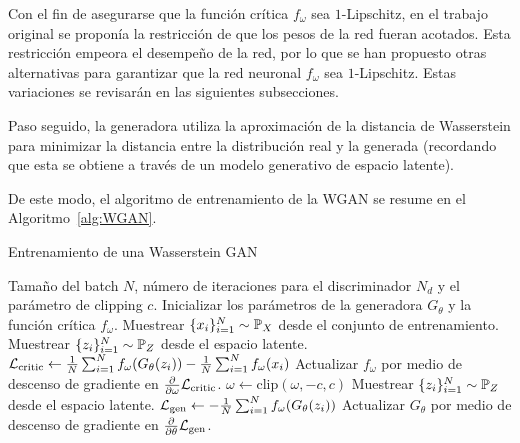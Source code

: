 Con el fin de asegurarse que la función crítica $f_\omega$ sea $1$-Lipschitz, en el trabajo original se proponía la restricción de que los pesos de la red fueran acotados. Esta restricción empeora el desempeño de la red, por lo que se han propuesto otras alternativas para garantizar que la red neuronal $f_\omega$ sea $1$-Lipschitz. Estas variaciones se revisarán en las siguientes subsecciones.

Paso seguido, la generadora utiliza la aproximación de la distancia de Wasserstein para minimizar la distancia entre la distribución real y la generada (recordando que esta se obtiene a través de un modelo generativo de espacio latente).

De este modo, el algoritmo de entrenamiento de la WGAN se resume en el Algoritmo~\ref{alg:WGAN}.

\begin{algorithm}[H]
    \caption{Entrenamiento de una Wasserstein GAN}\label{alg:WGAN}
    \begin{algorithmic}[1]
        \Require Tamaño del batch $N$, número de iteraciones para el discriminador $N_d$ y el parámetro de clipping $c$.
        \State Inicializar los parámetros de la generadora $G_\theta$ y la función crítica $f_\omega$.
        \State Muestrear $\{x_i\}_{i=1}^{N} \sim \Prob_X$ desde el conjunto de entrenamiento.
        \State Muestrear $\{z_i\}_{i=1}^{N} \sim \Prob_Z$ desde el espacio latente.
        \State $\mathcal{L}_{\mathrm{critic}} \gets
            \frac{1}{N} \sum_{i=1}^{N} f_{\omega}(G_\theta(z_i)) - \frac{1}{N} \sum_{i=1}^{N} f_{\omega}(x_i)$ 
        \State Actualizar $f_{\omega}$ por medio de descenso de gradiente en $\pdv{\omega} \mathcal{L}_{\mathrm{critic}}$.
        \State $\omega \gets \text{clip}(\omega, -c, c)$
        \EndFor
        \State Muestrear $\{z_i\}_{i=1}^{N} \sim \Prob_Z$ desde el espacio latente.
        \State $\mathcal{L}_{\mathrm{gen}} \gets - \frac{1}{N}\sum_{i=1}^{N} f_\omega(G_\theta(z_i))$ 
        \State Actualizar $G_\theta$ por medio de descenso de gradiente en $\pdv{\theta} \mathcal{L}_{\mathrm{gen}}$.
        \EndWhile
    \end{algorithmic}
\end{algorithm}


